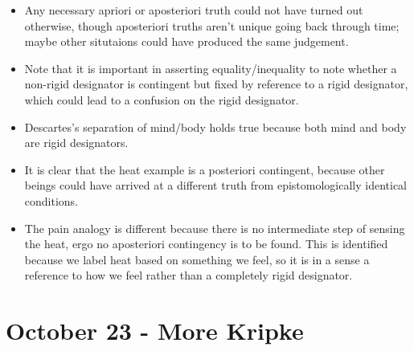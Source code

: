 \documentclass{report}
\begin{document}
\begin{itemize}
\item Any necessary apriori or aposteriori truth could not have turned out otherwise, though aposteriori truths aren't unique going back through time; maybe other situtaions could have produced the same judgement.
\item Note that it is important in asserting equality/inequality to note whether a non-rigid designator is contingent but fixed by reference to a rigid designator, which could lead to a confusion on the rigid designator.
\item Descartes's separation of mind/body holds true because both mind and body are rigid designators.
\item It is clear that the heat example is a posteriori contingent, because other beings could have arrived at a different truth from epistomologically identical conditions.
\item The pain analogy is different because there is no intermediate step of sensing the heat, ergo no aposteriori contingency is to be found. This is identified because we label heat based on something we feel, so it is in a sense a reference to how we feel rather than a completely rigid designator.
\end{itemize}

\section{October 23 - More Kripke}
\end{document}
